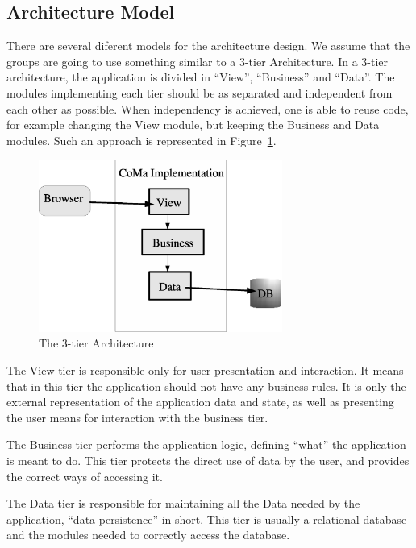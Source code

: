 \documentclass[11pt]{article}
\begin{document}
\subsection{Architecture Model}

\indent

There are several diferent models for the architecture design. We assume that the groups are going to use something similar to a 3-tier Architecture. In a 3-tier architecture, the application is divided in ``View'', ``Business'' and ``Data''. The modules implementing each tier should be as separated and independent from each other as possible. When independency is achieved, one is able to reuse code, for example changing the View module, but keeping the Business and Data modules. Such an approach is represented in Figure~\ref{fig:3tier}.



\begin{figure}[htbp]
  \centering
  \includegraphics[width=8cm]{3tier}
  \caption{The 3-tier Architecture}
  \label{fig:3tier}
\end{figure}


The View tier is responsible only for user presentation and interaction. It means that in this tier the application should not have any business rules. It is only the external representation of the application data and state, as well as presenting the user means for interaction with the business tier.

The Business tier performs the application logic, defining ``what'' the application is meant to do. This tier protects the direct use of data by the user, and provides the correct ways of accessing it.

The Data tier is responsible for maintaining all the Data needed by the application, ``data persistence'' in short. This tier is usually a relational database and the modules needed to correctly access the database.
\end{document}
